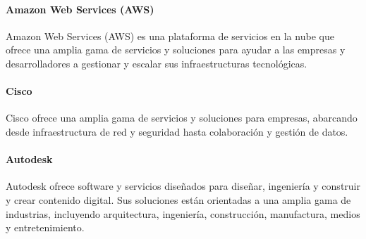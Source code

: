     \paragraph*{Amazon Web Services (AWS)} Amazon Web Services (AWS) es una plataforma de servicios en la nube que ofrece una amplia gama de servicios y soluciones para ayudar a las empresas y desarrolladores a gestionar y escalar sus infraestructuras tecnológicas. 

    \paragraph*{Cisco} Cisco ofrece una amplia gama de servicios y soluciones para empresas, abarcando desde infraestructura de red y seguridad hasta colaboración y gestión de datos. 
    
    \paragraph*{Autodesk} Autodesk ofrece software y servicios diseñados para diseñar, ingeniería y construir y crear contenido digital. Sus soluciones están orientadas a una amplia gama de industrias, incluyendo arquitectura, ingeniería, construcción, manufactura, medios y entretenimiento. 

